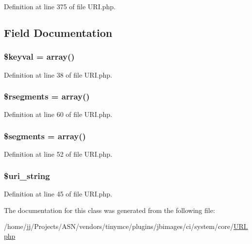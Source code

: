Definition at line 375 of file U\+R\+I.\+php.



\subsection{Field Documentation}
\subsubsection[{\texorpdfstring{\$keyval}{$keyval}}]{\setlength{\rightskip}{0pt plus 5cm}\$keyval = array()}\hypertarget{class_c_i___u_r_i_ae15942155aae4760439f552ad1fc3c34}{}\label{class_c_i___u_r_i_ae15942155aae4760439f552ad1fc3c34}


Definition at line 38 of file U\+R\+I.\+php.

\subsubsection[{\texorpdfstring{\$rsegments}{$rsegments}}]{\setlength{\rightskip}{0pt plus 5cm}\$rsegments = array()}\hypertarget{class_c_i___u_r_i_abf60189292b5fda02cdf36e5d7417a33}{}\label{class_c_i___u_r_i_abf60189292b5fda02cdf36e5d7417a33}


Definition at line 60 of file U\+R\+I.\+php.

\subsubsection[{\texorpdfstring{\$segments}{$segments}}]{\setlength{\rightskip}{0pt plus 5cm}\$segments = array()}\hypertarget{class_c_i___u_r_i_a8d7f597e2b6cf2aaef663822d1b96a82}{}\label{class_c_i___u_r_i_a8d7f597e2b6cf2aaef663822d1b96a82}


Definition at line 52 of file U\+R\+I.\+php.

\subsubsection[{\texorpdfstring{\$uri\+\_\+string}{$uri_string}}]{\setlength{\rightskip}{0pt plus 5cm}\${\bf uri\+\_\+string}}\hypertarget{class_c_i___u_r_i_ab908b3e655463a05e8a646c965ca4e53}{}\label{class_c_i___u_r_i_ab908b3e655463a05e8a646c965ca4e53}


Definition at line 45 of file U\+R\+I.\+php.



The documentation for this class was generated from the following file\+:\begin{DoxyCompactItemize}
\item 
/home/jj/\+Projects/\+A\+S\+N/vendors/tinymce/plugins/jbimages/ci/system/core/\hyperlink{_u_r_i_8php}{U\+R\+I.\+php}\end{DoxyCompactItemize}
